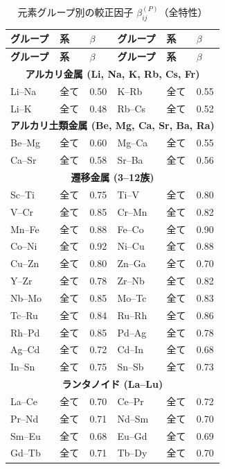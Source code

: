 \documentclass[12pt,a4paper]{article}
\begin{document}
	\begin{longtable}{p{2.5cm} p{2.5cm} p{1.2cm} p{2.5cm} p{2.5cm} p{1.2cm}}
		\caption{元素グループ別の較正因子 $\beta_{ij}^{(P)}$（全特性）}\label{tab:beta_group}\\
		\toprule
		\textbf{グループ} & \textbf{系} & $\beta$ & \textbf{グループ} & \textbf{系} & $\beta$ \\
		\midrule
		\endfirsthead
		\toprule
		\textbf{グループ} & \textbf{系} & $\beta$ & \textbf{グループ} & \textbf{系} & $\beta$ \\
		\midrule
		\endhead
		\multicolumn{6}{c}{\textbf{アルカリ金属 (Li, Na, K, Rb, Cs, Fr)}} \\
		Li–Na & 全て & 0.50 & K–Rb & 全て & 0.55 \\
		Li–K  & 全て & 0.48 & Rb–Cs & 全て & 0.52 \\
		\multicolumn{6}{c}{\textbf{アルカリ土類金属 (Be, Mg, Ca, Sr, Ba, Ra)}} \\
		Be–Mg & 全て & 0.60 & Mg–Ca & 全て & 0.55 \\
		Ca–Sr & 全て & 0.58 & Sr–Ba & 全て & 0.56 \\
		\multicolumn{6}{c}{\textbf{遷移金属 (3–12族)}} \\
		Sc–Ti & 全て & 0.75 & Ti–V & 全て & 0.80 \\
		V–Cr  & 全て & 0.85 & Cr–Mn & 全て & 0.82 \\
		Mn–Fe & 全て & 0.88 & Fe–Co & 全て & 0.90 \\
		Co–Ni & 全て & 0.92 & Ni–Cu & 全て & 0.88 \\
		Cu–Zn & 全て & 0.80 & Zn–Ga & 全て & 0.70 \\
		Y–Zr  & 全て & 0.78 & Zr–Nb & 全て & 0.82 \\
		Nb–Mo & 全て & 0.85 & Mo–Tc & 全て & 0.83 \\
		Tc–Ru & 全て & 0.84 & Ru–Rh & 全て & 0.86 \\
		Rh–Pd & 全て & 0.85 & Pd–Ag & 全て & 0.78 \\
		Ag–Cd & 全て & 0.72 & Cd–In & 全て & 0.68 \\
		In–Sn & 全て & 0.75 & Sn–Sb & 全て & 0.73 \\
		\multicolumn{6}{c}{\textbf{ランタノイド (La–Lu)}} \\
		La–Ce & 全て & 0.70 & Ce–Pr & 全て & 0.72 \\
		Pr–Nd & 全て & 0.71 & Nd–Sm & 全て & 0.70 \\
		Sm–Eu & 全て & 0.68 & Eu–Gd & 全て & 0.69 \\
		Gd–Tb & 全て & 0.71 & Tb–Dy & 全て & 0.70 \\

\end{longtable}
\end{document}
